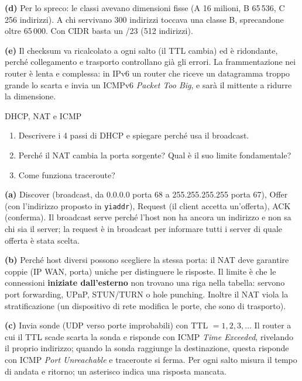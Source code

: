 \textbf{(d)} Per lo spreco: le classi avevano dimensioni fisse (A 16 milioni, B 65\,536, C 256 indirizzi). A chi servivano 300 indirizzi
toccava una classe B, sprecandone oltre 65\,000. Con CIDR basta un /23 (512 indirizzi).

\textbf{(e)} Il checksum va ricalcolato a ogni salto (il TTL cambia) ed è ridondante, perché collegamento e trasporto controllano già
gli errori. La frammentazione nei router è lenta e complessa: in IPv6 un router che riceve un datagramma troppo grande lo scarta e invia
un ICMPv6 \emph{Packet Too Big}, e sarà il mittente a ridurre la dimensione.

\begin{esercizio}{DHCP, NAT e ICMP}
\begin{enumerate}[label=(\alph*)]
    \item Descrivere i 4 passi di DHCP e spiegare perché usa il broadcast.
    \item Perché il NAT cambia la porta sorgente? Qual è il suo limite fondamentale?
    \item Come funziona traceroute?
\end{enumerate}
\end{esercizio}

\svolgimento
\textbf{(a)} Discover (broadcast, da 0.0.0.0 porta 68 a 255.255.255.255 porta 67), Offer (con l'indirizzo proposto in \texttt{yiaddr}),
Request (il client accetta un'offerta), ACK (conferma). Il broadcast serve perché l'host non ha ancora un indirizzo e non sa chi sia il
server; la request è in broadcast per informare tutti i server di quale offerta è stata scelta.

\textbf{(b)} Perché host diversi possono scegliere la stessa porta: il NAT deve garantire coppie (IP WAN, porta) uniche per distinguere le
risposte. Il limite è che le connessioni \textbf{iniziate dall'esterno} non trovano una riga nella tabella: servono port forwarding, UPnP,
STUN/TURN o hole punching. Inoltre il NAT viola la stratificazione (un dispositivo di rete modifica le porte, che sono di trasporto).

\textbf{(c)} Invia sonde (UDP verso porte improbabili) con TTL $= 1, 2, 3, \dots$ Il router a cui il TTL scade scarta la sonda e risponde con
ICMP \emph{Time Exceeded}, rivelando il proprio indirizzo; quando la sonda raggiunge la destinazione, questa risponde con ICMP \emph{Port
Unreachable} e traceroute si ferma. Per ogni salto misura il tempo di andata e ritorno; un asterisco indica una risposta mancata.

